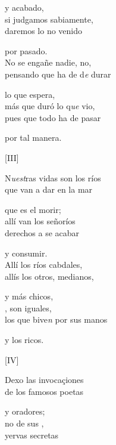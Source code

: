 \documentclass[11pt,a4paper,twoside]{article}
\newcommand{\comillas}[1]{«#1»}
\begin{document}
{y acabado,\\
si judgamos sabiamente,\\
daremos lo no venido 

por pasado.\\
No se engañe nadie, no,\\
pensando que ha de d\textit{e} durar 

lo que espera,\\
más que duró lo q\textit{ue} vio,\\
pues que todo ha de pasar

por tal manera.
\pend

\begin{center}
		[III]\footnoteA{[III] \comillas{conpara} \textit{LB3}.}
\end{center}
\pstart
N\textit{uest}ras vidas son los ríos\\
que van a dar en la mar

que es el morir;\\
allí van los señoríos\\
derechos a se acabar

y consumir.\\
Allí los ríos cabdales,\\
allís los otros, medianos,

y más chicos,\\
, son iguales,\\
los que bive\textit{n} por sus manos

y los ricos.
\pend

\begin{center}
	[IV]
\end{center}
\pstart
Dexo las invocaçiones\\
de los famosos poetas

y oradores;\\
no  de sus ,\\
 yervas secretas

}
\end{document}
